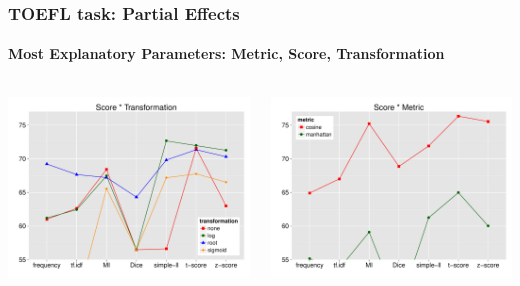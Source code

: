 \documentclass[t]{beamer} %
\begin{document}
\begin{frame}
  \frametitle{TOEFL task: Partial Effects}
  \framesubtitle{Most Explanatory Parameters: Metric, Score, Transformation} 
  
  \begin{columns}
    
    \begin{column}{0.5\textwidth}
      \hspace*{-18pt} 
      \includegraphics[scale=0.30]{img/lapesa_toefl_main_score_transformation}
    \end{column}


    \begin{column}{0.5\textwidth}
      \centering
      \hspace*{-18pt}   \includegraphics[scale=0.30]{img/lapesa_toefl_main_score_metric}

    \end{column}
  \end{columns}  
  
\end{frame}
\end{document}
